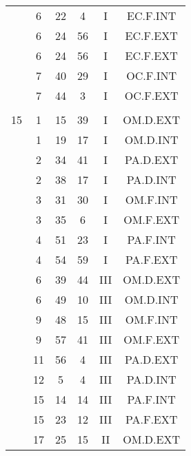 \documentclass[12pt, a4paper]{article}
\begin{document}
\begin{multicols}{3}
{\begin{tabular}{c c c c c c}
	 	 	 	 & 6 & 22 & 4 & I & EC.F.INT\\%
	 	 	 	 & 6 & 24 & 56 & I & EC.F.EXT\\%
	 	 	 	 & 6 & 24 & 56 & I & EC.F.EXT\\%
	 	 	 	 & 7 & 40 & 29 & I & OC.F.INT\\%
	 	 	 	 & 7 & 44 & 3 & I & OC.F.EXT\\%
	 	 	 	 & & & & & \\%
	 	 	 	15 & 1 & 15 & 39 & I & OM.D.EXT\\%
	 	 	 	 & 1 & 19 & 17 & I & OM.D.INT\\%
	 	 	 	 & 2 & 34 & 41 & I & PA.D.EXT\\%
	 	 	 	 & 2 & 38 & 17 & I & PA.D.INT\\%
	 	 	 	 & 3 & 31 & 30 & I & OM.F.INT\\%
	 	 	 	 & 3 & 35 & 6 & I & OM.F.EXT\\%
	 	 	 	 & 4 & 51 & 23 & I & PA.F.INT\\%
	 	 	 	 & 4 & 54 & 59 & I & PA.F.EXT\\%
	 	 	 	 & 6 & 39 & 44 & III & OM.D.EXT\\%
	 	 	 	 & 6 & 49 & 10 & III & OM.D.INT\\%
	 	 	 	 & 9 & 48 & 15 & III & OM.F.INT\\%
	 	 	 	 & 9 & 57 & 41 & III & OM.F.EXT\\%
	 	 	 	 & 11 & 56 & 4 & III & PA.D.EXT\\%
	 	 	 	 & 12 & 5 & 4 & III & PA.D.INT\\%
	 	 	 	 & 15 & 14 & 14 & III & PA.F.INT\\%
	 	 	 	 & 15 & 23 & 12 & III & PA.F.EXT\\%
	 	 	 	 & 17 & 25 & 15 & II & OM.D.EXT\\%

\end{tabular}}
\end{multicols}
\end{document}
